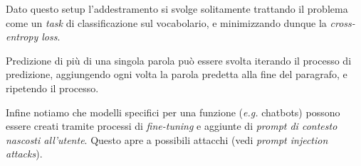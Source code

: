Dato questo setup l'addestramento si svolge solitamente trattando il problema come un \textit{task} di classificazione sul vocabolario, e minimizzando dunque la \textit{cross-entropy loss}.

Predizione di più di una singola parola può essere svolta iterando il processo di predizione, aggiungendo ogni volta la parola predetta alla fine del paragrafo, e ripetendo il processo.

Infine notiamo che modelli specifici per una funzione (\textit{e.g.} chatbots) possono essere creati tramite processi di \textit{fine-tuning} e aggiunte di \textit{prompt di contesto nascosti all'utente}. Questo apre a possibili attacchi (vedi \textit{prompt injection attacks}).






